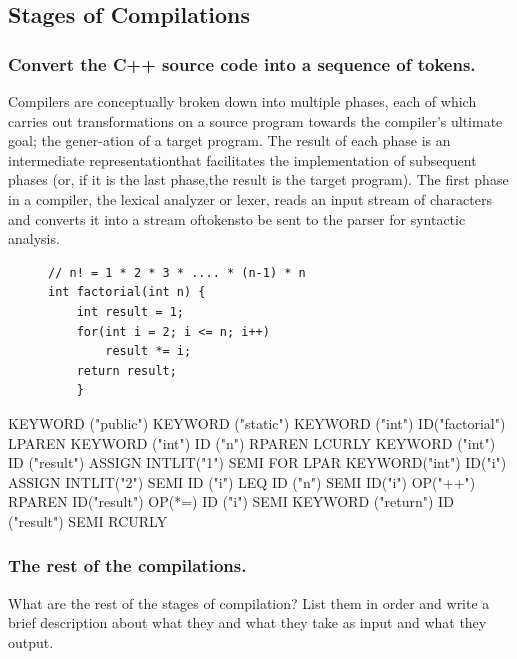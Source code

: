 \documentclass[a4paper]{exam}
\begin{document}
\subsection{Stages of Compilations}
\subsubsection{Convert the C++ source code into a sequence of tokens.}
Compilers are conceptually broken down into multiple phases, each of which carries out transformations on a source program towards the compiler’s ultimate goal; the gener-ation of a target program.  The result of each phase is an intermediate representationthat facilitates the implementation of subsequent phases (or,  if it is the last phase,the result is the target program). The first phase in a compiler, the lexical analyzer or lexer, reads an input stream of characters and converts it into a stream oftokensto be sent to the parser for syntactic analysis.

\begin{figure}[H]
  \begin{verbatim}
// n! = 1 * 2 * 3 * .... * (n-1) * n
int factorial(int n) {
    int result = 1;
    for(int i = 2; i <= n; i++)
        result *= i;
    return result;
    }
    \end{verbatim}
\end{figure}

\begin{solution}
  KEYWORD ("public") KEYWORD ("static") KEYWORD ("int") ID("factorial") LPAREN KEYWORD ("int") ID ("n") RPAREN LCURLY KEYWORD ("int") ID ("result") ASSIGN INTLIT("1") SEMI FOR LPAR KEYWORD("int") ID("i") ASSIGN INTLIT("2") SEMI ID ("i") LEQ ID ("n") SEMI ID("i") OP("++") RPAREN ID("result") OP(*=) ID ("i") SEMI KEYWORD ("return") ID ("result") SEMI RCURLY
\end{solution}
\subsubsection{The rest of the compilations.}
What are the rest of the stages of compilation? List them in order and write a brief description about what they and what they take as input and what they output.\\
\end{document}
